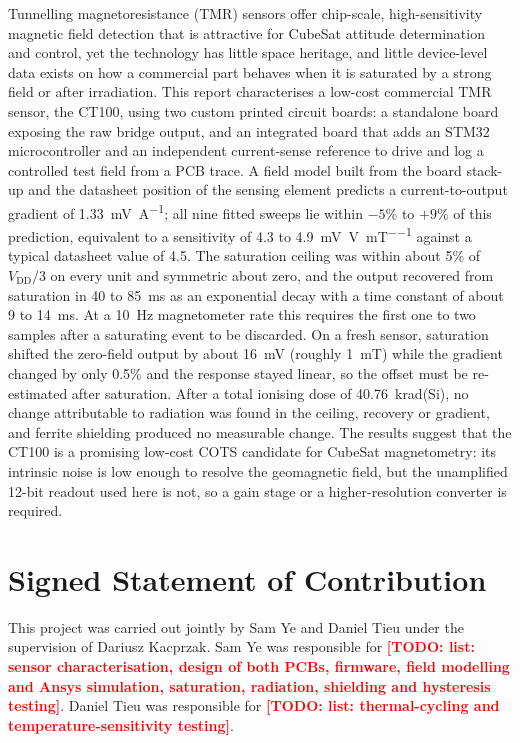 \documentclass[12pt,a4paper]{article}
\newcommand{\todo}[1]{\textcolor{red}{\textbf{[TODO: #1]}}}
\begin{document}
Tunnelling magnetoresistance (TMR) sensors offer chip-scale, high-sensitivity magnetic field detection that is attractive for CubeSat attitude determination and control, yet the technology has little space heritage, and little device-level data exists on how a commercial part behaves when it is saturated by a strong field or after irradiation. This report characterises a low-cost commercial TMR sensor, the CT100, using two custom printed circuit boards: a standalone board exposing the raw bridge output, and an integrated board that adds an STM32 microcontroller and an independent current-sense reference to drive and log a controlled test field from a PCB trace. A field model built from the board stack-up and the datasheet position of the sensing element predicts a current-to-output gradient of \SI{1.33}{\milli\volt\per\ampere}; all nine fitted sweeps lie within $-5\%$ to $+9\%$ of this prediction, equivalent to a sensitivity of 4.3 to \SI{4.9}{\milli\volt\per\volt\per\milli\tesla} against a typical datasheet value of 4.5. The saturation ceiling was within about 5\% of $V_{\text{DD}}/3$ on every unit and symmetric about zero, and the output recovered from saturation in 40 to \SI{85}{\milli\second} as an exponential decay with a time constant of about 9 to \SI{14}{\milli\second}. At a \SI{10}{\hertz} magnetometer rate this requires the first one to two samples after a saturating event to be discarded. On a fresh sensor, saturation shifted the zero-field output by about \SI{16}{\milli\volt} (roughly \SI{1}{\milli\tesla}) while the gradient changed by only 0.5\% and the response stayed linear, so the offset must be re-estimated after saturation. After a total ionising dose of \SI{40.76}{\kilo rad}(Si), no change attributable to radiation was found in the ceiling, recovery or gradient, and ferrite shielding produced no measurable change. The results suggest that the CT100 is a promising low-cost COTS candidate for CubeSat magnetometry: its intrinsic noise is low enough to resolve the geomagnetic field, but the unamplified 12-bit readout used here is not, so a gain stage or a higher-resolution converter is required.

\clearpage

\section*{Signed Statement of Contribution}
This project was carried out jointly by Sam Ye and Daniel Tieu under the supervision of Dariusz Kacprzak. Sam Ye was responsible for \todo{list: sensor characterisation, design of both PCBs, firmware, field modelling and Ansys simulation, saturation, radiation, shielding and hysteresis testing}. Daniel Tieu was responsible for \todo{list: thermal-cycling and temperature-sensitivity testing}.
 
\end{document}
